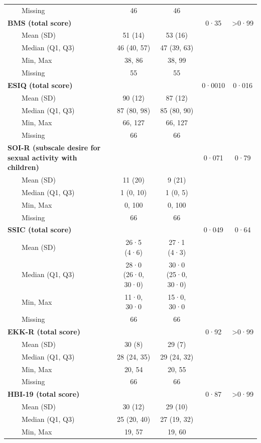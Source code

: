 \documentclass[
  super,
  preprint,
  1p,
  onecolumn]{elsarticle}
\begin{document}
\begin{table}
{\begin{tabular*}{\linewidth}{@{\extracolsep{\fill}}lcccc}
    Missing & 46 & 46 &  &  \\ 
{\bfseries BMS (total score)} &  &  & 0·35 & >0·99 \\ 
    Mean (SD) & 51 (14) & 53 (16) &  &  \\ 
    Median (Q1, Q3) & 46 (40, 57) & 47 (39, 63) &  &  \\ 
    Min, Max & 38, 86 & 38, 99 &  &  \\ 
    Missing & 55 & 55 &  &  \\ 
{\bfseries ESIQ (total score)} &  &  & 0·0010 & 0·016 \\ 
    Mean (SD) & 90 (12) & 87 (12) &  &  \\ 
    Median (Q1, Q3) & 87 (80, 98) & 85 (80, 90) &  &  \\ 
    Min, Max & 66, 127 & 66, 127 &  &  \\ 
    Missing & 66 & 66 &  &  \\ 
{\bfseries SOI-R (subscale desire for sexual activity with children)} &  &  & 0·071 & 0·79 \\ 
    Mean (SD) & 11 (20) & 9 (21) &  &  \\ 
    Median (Q1, Q3) & 1 (0, 10) & 1 (0, 5) &  &  \\ 
    Min, Max & 0, 100 & 0, 100 &  &  \\ 
    Missing & 66 & 66 &  &  \\ 
{\bfseries SSIC (total score)} &  &  & 0·049 & 0·64 \\ 
    Mean (SD) & 26·5 (4·6) & 27·1 (4·3) &  &  \\ 
    Median (Q1, Q3) & 28·0 (26·0, 30·0) & 30·0 (25·0, 30·0) &  &  \\ 
    Min, Max & 11·0, 30·0 & 15·0, 30·0 &  &  \\ 
    Missing & 66 & 66 &  &  \\ 
{\bfseries EKK-R (total score)} &  &  & 0·92 & >0·99 \\ 
    Mean (SD) & 30 (8) & 29 (7) &  &  \\ 
    Median (Q1, Q3) & 28 (24, 35) & 29 (24, 32) &  &  \\ 
    Min, Max & 20, 54 & 20, 55 &  &  \\ 
    Missing & 66 & 66 &  &  \\ 
{\bfseries HBI-19 (total score)} &  &  & 0·87 & >0·99 \\ 
    Mean (SD) & 30 (12) & 29 (10) &  &  \\ 
    Median (Q1, Q3) & 25 (20, 40) & 27 (19, 32) &  &  \\ 
    Min, Max & 19, 57 & 19, 60 &  &  \\ 

\end{tabular*}}
\end{table}
\end{document}
